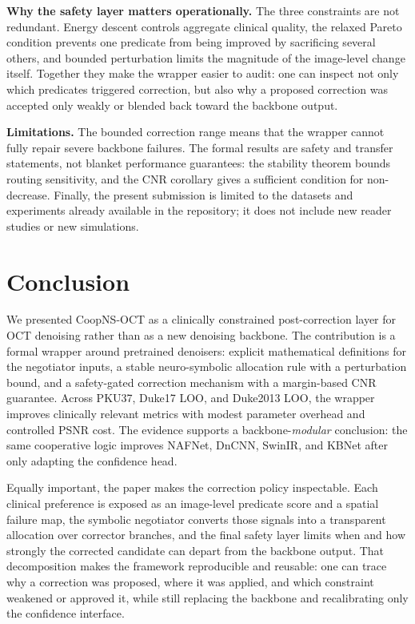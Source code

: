 \documentclass{ieeetj}
\begin{document}
\textbf{Why the safety layer matters operationally.}
The three constraints are not redundant. Energy descent controls aggregate clinical quality, the relaxed Pareto condition prevents one predicate from being improved by sacrificing several others, and bounded perturbation limits the magnitude of the image-level change itself. Together they make the wrapper easier to audit: one can inspect not only which predicates triggered correction, but also why a proposed correction was accepted only weakly or blended back toward the backbone output.

\textbf{Limitations.}
The bounded correction range means that the wrapper cannot fully repair severe backbone failures. The formal results are safety and transfer statements, not blanket performance guarantees: the stability theorem bounds routing sensitivity, and the CNR corollary gives a sufficient condition for non-decrease. Finally, the present submission is limited to the datasets and experiments already available in the repository; it does not include new reader studies or new simulations.
\section{Conclusion}
\label{sec:conclusion}

We presented CoopNS-OCT as a clinically constrained post-correction layer for OCT denoising rather than as a new denoising backbone. The contribution is a formal wrapper around pretrained denoisers: explicit mathematical definitions for the negotiator inputs, a stable neuro-symbolic allocation rule with a perturbation bound, and a safety-gated correction mechanism with a margin-based CNR guarantee. Across PKU37, Duke17 LOO, and Duke2013 LOO, the wrapper improves clinically relevant metrics with modest parameter overhead and controlled PSNR cost. The evidence supports a backbone-\emph{modular} conclusion: the same cooperative logic improves NAFNet, DnCNN, SwinIR, and KBNet after only adapting the confidence head.

Equally important, the paper makes the correction policy inspectable. Each clinical preference is exposed as an image-level predicate score and a spatial failure map, the symbolic negotiator converts those signals into a transparent allocation over corrector branches, and the final safety layer limits when and how strongly the corrected candidate can depart from the backbone output. That decomposition makes the framework reproducible and reusable: one can trace why a correction was proposed, where it was applied, and which constraint weakened or approved it, while still replacing the backbone and recalibrating only the confidence interface.
\end{document}
